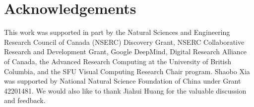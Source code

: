\section*{Acknowledgements}
This work was supported in part by the Natural Sciences and Engineering Research Council of Canada (NSERC) Discovery Grant, NSERC Collaborative Research and Development Grant, Google DeepMind, Digital Research Alliance of Canada, the Advanced Research Computing at the University of British Columbia, and the SFU Visual Computing Research Chair program.
Shaobo Xia was supported by National Natural Science Foundation of China under Grant 42201481.
We would also like to thank Jiahui Huang for the valuable discussion and feedback.
